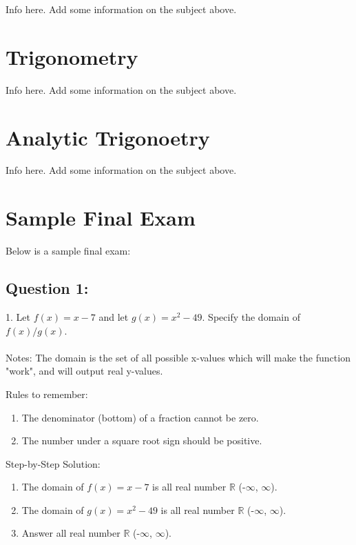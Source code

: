 \documentclass[12pt, letterpaper]{article}
\begin{document}
Info here. Add some information on the subject above. 

\section{Trigonometry}

Info here. Add some information on the subject above. 

\section{Analytic Trigonoetry}

Info here. Add some information on the subject above. 


\section{Sample Final Exam}
Below is a sample final exam:

\subsection{Question 1:}
1. Let $f(x)=x-7$ and let $g(x)=x^2-49$. Specify the domain of $f(x)/g(x)$.\\\\
Notes: The domain is the set of all possible x-values which will make the 
function "work", and will output real y-values.

Rules to remember:
\begin{enumerate}
  \item The denominator (bottom) of a fraction cannot be zero.
  \item The number under a square root sign should be positive.
\end{enumerate}

Step-by-Step Solution:
\begin{enumerate}
  \item The domain of $f(x)=x-7$ is all real number 
  $\mathbb{R}$ (-$\infty$, $\infty$). 
  \item The domain of $g(x)=x^2-49$ is all real number 
  $\mathbb{R}$ (-$\infty$, $\infty$).\\
  \item Answer all real number $\mathbb{R}$ (-$\infty$, $\infty$).
\end{enumerate}
\end{document}
